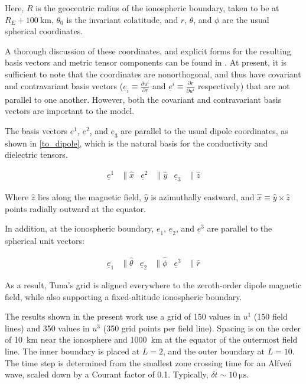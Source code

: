 \documentclass[draft,linenumbers]{agujournal}
\begin{document}
Here, $R$ is the geocentric radius of the ionospheric boundary, taken to be at $R_E + \SI{100}{\km}$, $\theta_0$ is the invariant colatitude, and $r$, $\theta$, and $\phi$ are the usual spherical coordinates.

A thorough discussion of these coordinates, and explicit forms for the resulting basis vectors and metric tensor components can be found in \citet{lysak_2004}. At present, it is sufficient to note that the coordinates are nonorthogonal, and thus have covariant and contravariant basis vectors (${\underline{e}_i \equiv \frac{\partial u^i}{\partial \underline{r}}}$ and ${\underline{e}^i \equiv \frac{\partial \underline{r}}{\partial u^i}}$ respectively) that are not parallel to one another. However, both the covariant and contravariant basis vectors are important to the model.

The basis vectors $\underline{e}^1$, $\underline{e}^2$, and $\underline{e}_3$ are parallel to the usual dipole coordinates, as shown in \cref{to_dipole}, which is the natural basis for the conductivity and dielectric tensors.
\begin{linenomath*}
\begin{align}
    \label{to_dipole}
    \underline{e}^1 &\parallel \hat{x} &
    \underline{e}^2 &\parallel \hat{y} &
    \underline{e}_3 &\parallel \hat{z}
\end{align}
\end{linenomath*}

Where $\hat{z}$ lies along the magnetic field, $\hat{y}$ is azimuthally eastward, and $\hat{x} \equiv \hat{y} \times \hat{z}$ points radially outward at the equator.

In addition, at the ionospheric boundary, $\underline{e}_1$, $\underline{e}_2$, and $\underline{e}^3$ are parallel to the spherical unit vectors:
\begin{linenomath*}
\begin{align}
  \underline{e}_1 &\parallel \hat{\theta} &
  \underline{e}_2 &\parallel \hat{\phi} &
  \underline{e}^3 &\parallel \hat{r}
\end{align}
\end{linenomath*}

As a result, Tuna's grid is aligned everywhere to the zeroth-order dipole magnetic field, while also supporting a fixed-altitude ionospheric boundary.

The results shown in the present work use a grid of 150 values in $u^1$ (150 field lines) and 350 values in $u^3$ (350 grid points per field line). Spacing is on the order of \SI{10}{\km} near the ionosphere and \SI{1000}{\km} at the equator of the outermost field line. The inner boundary is placed at $L = 2$, and the outer boundary at $L = 10$. The time step is determined from the smallest zone crossing time for an Alfve\'n wave, scaled down by a Courant factor of \num{0.1}. Typically, $\delta \! t \sim \SI{10}{\us}$.
\end{document}
